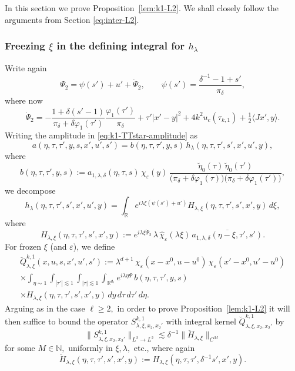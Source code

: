 \documentclass[leqno]{amsart}
\theoremstyle{definition}
\theoremstyle{remark}
\numberwithin{equation}{section}
\newcommand{\R}{\mathbb{R}}
\newcommand{\N}{\mathbb{N}}
\newcommand\la{{\lambda}}
\newcommand\ve{{\varepsilon}}
\newcommand\de{{\delta}}
\begin{document}
In this section we  prove Proposition~\ref{lem:k1-L2}. We shall closely follow the arguments  from Section \ref{eq:inter-L2}.

\subsubsection{ Freezing $\xi$ in the defining integral for $h_\la$} 
Write again
\[
\Psi_2=\psi(s')+u'+\dot\Psi_2,
\qquad
\psi(s')=\frac{\delta^{-1}-1+s'}{\pi_\delta},
\]
where now
\[
\dot\Psi_2
= -\frac{1+\delta(s'-1)}{\pi_\delta+\delta\varphi_1(\tau')}
\frac{\varphi_1(\tau')}{\pi_\delta}
+\tau'|x'-y|^2+4k^2u_c(\tau_{k,1})
+\tfrac12\langle Jx',y\rangle.
\]
Writing the amplitude in \eqref{eq:k1-TTstar-amplitude} as
\[
a(\eta,\tau,\tau',y,s,x',u',s')=b(\eta,\tau,\tau',y,s)\,
 h_\lambda(\eta,\tau,\tau',s',x',u',y),
\]
where
\[
b(\eta,\tau,\tau',y,s):=a_{1,\la,\de}(\eta,\tau,s)\,\chi_\varepsilon(y)\,
\frac{\breve\eta_0(\tau)\,\breve\eta_0(\tau')}
{\big(\pi_\delta+\delta\varphi_1(\tau)\big)
 \big(\pi_\delta+\delta\varphi_1(\tau')\big)},
\]
we decompose
\[
h_\lambda(\eta,\tau,\tau',s',x',u',y) =\int_\R e^{i\la\xi(\psi(s')+u')}
H_{\la,\xi}(\eta,\tau,\tau',s',x',y)\,d\xi,
\]
where
\[
H_{\la,\xi}(\eta,\tau,\tau',s',x',y)
:=e^{i\la\xi\dot\Psi_2}\,
\lambda\,\widehat\chi_\varepsilon(\lambda\xi)\,
\overline{a_{1,\la,\de}(\eta-\xi,\tau',s')}.
\]
For frozen $\xi$ (and $\ve$), we define
\begin{multline}
\breve Q^{k,1}_{\lambda,\xi}(x,u,s,x',u',s')
:=\lambda^{d+1}\,\chi_\varepsilon(x-x^0,u-u^0)\,
\chi_\varepsilon(x'-x^0,u'-u^0)\\
\times\int_{\eta\sim1}\int_{|\tau'|\lesssim1}\int_{|\tau|\lesssim1}
\int_{\R^{d_1}}e^{i\lambda\eta\Psi}\,
 b(\eta,\tau,\tau',y,s)\\
\times H_{\la,\xi}(\eta,\tau,\tau',s',x',y)\,
 dy\,d\tau\,d\tau'\,d\eta. \label{eq:Qk1xi}
\end{multline}
Arguing as in the case $\ell\ge 2,$ in order to prove Proposition~\ref{lem:k1-L2} it will then suffice to bound the operator $S_{\lambda,\xi,x_2,x_2'}^{k,1}$ with integral kernel $\breve Q_{\lambda,\xi,x_2,x_2'}^{k,1}$ by
\begin{equation}\label{estxix11}
\|S_{\lambda,\xi,x_2,x_2'}^{k,1}\|_{L^2\to L^2}\lesssim \delta^{-1} \|\breve H_{\la,\xi}\|_{C^M}
\end{equation}
for some $M\in \N,$ uniformly in $\xi,\la,$ etc., where again
\[
\breve H_{\la,\xi}(\eta,\tau,\tau',s',x',y)
:=H_{\la,\xi}(\eta,\tau,\tau',\delta^{-1}s',x',y).
\]
\end{document}
